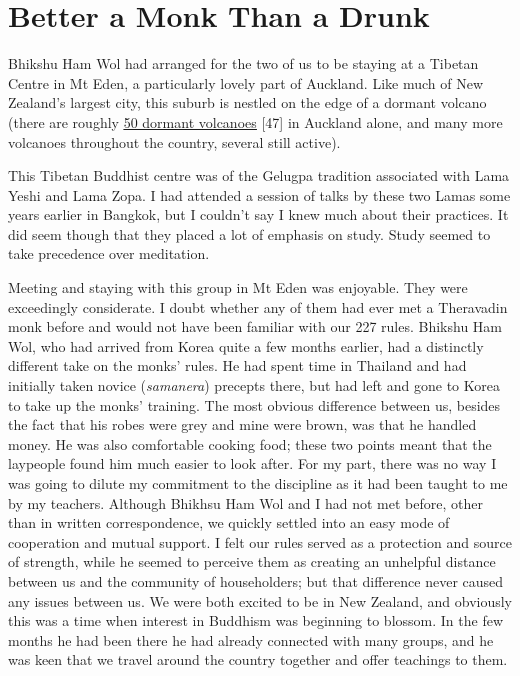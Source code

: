 \chapter{Better a Monk Than a Drunk}

Bhikshu Ham Wol had arranged for the two of us to be staying at a
Tibetan Centre in Mt Eden, a particularly lovely part of Auckland. Like
much of New Zealand's largest city, this suburb is nestled on the edge
of a dormant volcano (there are roughly
\href{https://en.wikipedia.org/wiki/Auckland_volcanic_field}{\underline{50
dormant volcanoes}} {[}47{]} in Auckland alone, and many more volcanoes
throughout the country, several still active).

This Tibetan Buddhist centre was of the Gelugpa tradition associated
with Lama Yeshi and Lama Zopa. I had attended a session of talks by
these two Lamas some years earlier in Bangkok, but I couldn't say I knew
much about their practices. It did seem though that they placed a lot of
emphasis on study. Study seemed to take precedence over meditation.

Meeting and staying with this group in Mt Eden was enjoyable. They were
exceedingly considerate. I doubt whether any of them had ever met a
Theravadin monk before and would not have been familiar with our 227
rules. Bhikshu Ham Wol, who had arrived from Korea quite a few months
earlier, had a distinctly different take on the monks' rules. He had
spent time in Thailand and had initially taken novice (\emph{samanera})
precepts there, but had left and gone to Korea to take up the monks'
training. The most obvious difference between us, besides the fact that
his robes were grey and mine were brown, was that he handled money. He
was also comfortable cooking food; these two points meant that the
laypeople found him much easier to look after. For my part, there was no
way I was going to dilute my commitment to the discipline as it had been
taught to me by my teachers. Although Bhikhsu Ham Wol and I had not met
before, other than in written correspondence, we quickly settled into an
easy mode of cooperation and mutual support. I felt our rules served as
a protection and source of strength, while he seemed to perceive them as
creating an unhelpful distance between us and the community of
householders; but that difference never caused any issues between us. We
were both excited to be in New Zealand, and obviously this was a time
when interest in Buddhism was beginning to blossom. In the few months he
had been there he had already connected with many groups, and he was
keen that we travel around the country together and offer teachings to
them.

